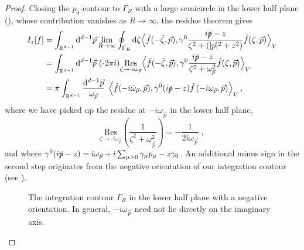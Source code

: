 \documentclass[10pt,a4paper,oneside,reqno]{amsart}
\newcommand{\reals}{\mathbb{R}}
\begin{document}
\begin{proof}
Closing the $p_0$-contour to $\Gamma_R$ with a large semicircle in the lower half plane (), whose contribution vanishes as $R \to \infty$, the residue theorem gives
\begin{align}
    I_z[f] &= \int_{\reals^{d-1}}\mathrm{d}^{d-1} \vec{p} \lim_{R\to\infty}\oint_{\Gamma_R}\mathrm{d} \zeta \Big\langle  \hat{f}(-\bar{\zeta}, \vec{p}),\gamma^0\frac{i\slashed p - z}{\zeta^2+(|\vec{p}|^2+z^2)}\hat{f}(\zeta, \vec{p})\Big\rangle_V\\
    &=\int_{\reals^{d-1}}\mathrm{d}^{d-1} \vec{p} \; (\text{-}2\pi i) \underset{\zeta\to \text{-}i\omega_{\vec{p}}}{\mathrm{Res}} \Big\langle \hat{f}(-\bar{\zeta}, \vec{p}),\gamma^0 \frac{i\slashed p - z}{\zeta^2+\omega_{\vec{p}}^2}\hat{f}(\zeta, \vec{p})\Big\rangle_V\\
    &= \pi \int_{\reals^{d-1}}\frac{\mathrm{d}^{d-1} \vec{p}}{\omega_{\vec{p}}}\;
    \left\langle  \hat{f}(-i\bar{\omega}_{\vec{p}},\vec{p}),\gamma^0 (i\slashed p - z)\hat{f}\left(-i\omega_{\vec{p}}, \vec{p}\right)\right\rangle_V,
 \end{align}
where we have picked up the residue at $-i\omega_{\vec{p}}$ in the lower half plane,
\begin{equation}
\underset{\zeta\to \text{-}i\omega_{\vec{p}}}{\mathrm{Res}} \left(\frac{1}{\zeta^2+\omega_{\vec{p}}^2}\right)= -\frac{1}{2i \omega_{\vec{p}}} \;,
\end{equation}
and where $\gamma^0 (i\slashed p - z) = i \omega_{\vec{p}} + i \sum_{\mu > 0} \gamma_\mu p_\mu - z \gamma_0$. 
An additional minus sign in the second step originates from the negative orientation of our integration contour (see ).
\begin{figure}
\centering
{}
\caption{The integration contour $\Gamma_R$ in the lower half plane with a negative orientation. In general, $-i\omega_{\vec{p}}$ need not lie directly on the imaginary axis.}
\label{Tikz integration contour}
\end{figure}
\end{proof}
\end{document}
